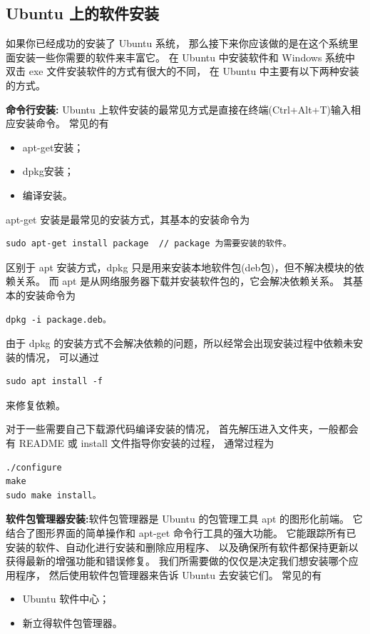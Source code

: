 \subsection{Ubuntu 上的软件安装}

如果你已经成功的安装了 Ubuntu 系统，
那么接下来你应该做的是在这个系统里面安装一些你需要的软件来丰富它。
在 Ubuntu 中安装软件和 Windows 系统中双击 exe 文件安装软件的方式有很大的不同，
在 Ubuntu 中主要有以下两种安装的方式。

\textbf{命令行安装:} Ubuntu 上软件安装的最常见方式是直接在终端(Ctrl+Alt+T)输入相应安装命令。
常见的有
\begin{itemize}
	\item apt-get安装；
	\item dpkg安装；
	\item 编译安装。
\end{itemize}

apt-get 安装是最常见的安装方式，其基本的安装命令为
\begin{verbatim}
sudo apt-get install package  // package 为需要安装的软件。
\end{verbatim}

区别于 apt 安装方式，dpkg 只是用来安装本地软件包(deb包)，但不解决模块的依赖关系。
而 apt 是从网络服务器下载并安装软件包的，它会解决依赖关系。
其基本的安装命令为
\begin{verbatim}
dpkg -i package.deb。
\end{verbatim}
由于 dpkg 的安装方式不会解决依赖的问题，所以经常会出现安装过程中依赖未安装的情况，
可以通过
\begin{verbatim}
sudo apt install -f	
\end{verbatim}
来修复依赖。

对于一些需要自己下载源代码编译安装的情况，
首先解压进入文件夹，一般都会有 README 或 install 文件指导你安装的过程，
通常过程为
\begin{verbatim}
./configure
make
sudo make install。
\end{verbatim}

\textbf{软件包管理器安装:}软件包管理器是 Ubuntu 的包管理工具 apt 的图形化前端。
它结合了图形界面的简单操作和 apt-get 命令行工具的强大功能。
它能跟踪所有已安装的软件、自动化进行安装和删除应用程序、
以及确保所有软件都保持更新以获得最新的增强功能和错误修复。
我们所需要做的仅仅是决定我们想安装哪个应用程序，
然后使用软件包管理器来告诉 Ubuntu 去安装它们。
常见的有
\begin{itemize}
	\item Ubuntu 软件中心；
	\item 新立得软件包管理器。
\end{itemize}

